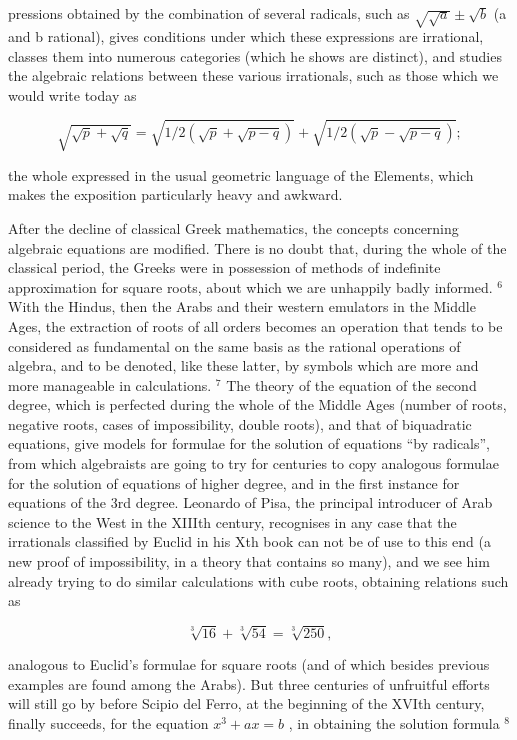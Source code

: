 pressions obtained by the combination of several radicals, such as \(\sqrt{\sqrt{a}} \pm \sqrt{b}\) (a and b rational), gives conditions under which these expressions are irrational, classes them into numerous categories (which he shows are distinct), and studies the algebraic relations between these various irrationals, such as those which we would write today as

\[
\sqrt {\sqrt {p} + \sqrt {q}} = \sqrt {1 / 2 (\sqrt {p} + \sqrt {p - q})} + \sqrt {1 / 2 (\sqrt {p} - \sqrt {p - q})};
\]

the whole expressed in the usual geometric language of the Elements, which makes the exposition particularly heavy and awkward.

After the decline of classical Greek mathematics, the concepts concerning algebraic equations are modified. There is no doubt that, during the whole of the classical period, the Greeks were in possession of methods of indefinite approximation for square roots, about which we are unhappily badly informed. \(^{6}\) With the Hindus, then the Arabs and their western emulators in the Middle Ages, the extraction of roots of all orders becomes an operation that tends to be considered as fundamental on the same basis as the rational operations of algebra, and to be denoted, like these latter, by symbols which are more and more manageable in calculations. \(^{7}\) The theory of the equation of the second degree, which is perfected during the whole of the Middle Ages (number of roots, negative roots, cases of impossibility, double roots), and that of biquadratic equations, give models for formulae for the solution of equations ``by radicals'', from which algebraists are going to try for centuries to copy analogous formulae for the solution of equations of higher degree, and in the first instance for equations of the 3rd degree. Leonardo of Pisa, the principal introducer of Arab science to the West in the XIIIth century, recognises in any case that the irrationals classified by Euclid in his Xth book can not be of use to this end (a new proof of impossibility, in a theory that contains so many), and we see him already trying to do similar calculations with cube roots, obtaining relations such as

\[
\sqrt [ 3 ]{16} + \sqrt [ 3 ]{54} = \sqrt [ 3 ]{250},
\]

analogous to Euclid's formulae for square roots (and of which besides previous examples are found among the Arabs). But three centuries of unfruitful efforts will still go by before Scipio del Ferro, at the beginning of the XVIth century, finally succeeds, for the equation \(x^{3} + ax = b\) , in obtaining the solution formula \(^{8}\)

